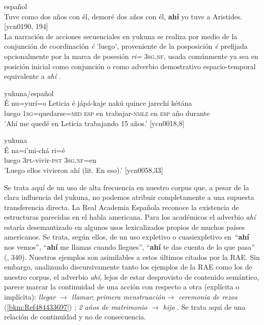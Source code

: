 \documentclass[output=paper]{langscibook}
\begin{document}
\ea\label{ex:lemus:13}
{español}\\
\label{bkm:Ref484433706}Tuve como dos años con él, demoré dos años con él, \textbf{ahí} yo tuve a Aristides. {[ycn0190, 194}]\\
\z
La narración de acciones secuenciales en yukuna se realiza por medio de la conjunción de coordinación \textit{é} 'luego', proveniente de la posposición \textit{é} prefijada opcionalmente por la marca de posesión \textit{ri=} 3\textsc{sg.nf}, usada comúnmente ya sea en posición inicial como conjunción  o como adverbio demostrativo espacio-temporal equivalente a \textit{ahí} .

\newpage
\ea\label{ex:lemus:14}
{yukuna/español}\\
\gll É  nu=yurí=o Leticia é   jápá-kaje   nakú   quince jarechí  kétána \\
luego 1\textsc{sg}=quedarse=\textsc{mid} \textsc{esp} en trabajar-\textsc{nmlz} {en} \textsc{esp} año    durante\\
\glt 'Ahí me quedé en Leticia trabajando 15 años.' [ycn0018,8]
\z

\ea\label{ex:lemus:15}
{yukuna}\\
\gll É na=i’mi-chá ri=é\\
     luego \textsc{3pl}-vivir-\textsc{pst}  \textsc{3sg.nf}=en\\
\glt 'Luego ellos vivieron ahí (lit. En eso).' [ycn0058,33]
\z

Se trata aquí de un uso de alta frecuencia en nuestro corpus que, a pesar de la clara influencia del yukuna, no podemos atribuir completamente a una supuesta transferencia directa. La Real Academia Española reconoce la existencia de estructuras parecidas en el habla americana.  Para los académicos el adverbio \textit{ahí} estaría desemantizado en algunos usos lexicalizados propios de muchos países americanos. Se trata, según ellos, de un uso expletivo o cuasiexpletivo en~“\textbf{ahí} nos vemos”, “\textbf{ahí} me llamas cuando llegues”, “\textbf{ahí} te das cuenta de lo que pasa” (\citealt{RAE2010}, 340).  Nuestros ejemplos son asimilables a estos últimos citados por la RAE.  Sin embargo, analizando discursivamente tanto los ejemplos de la RAE como los de nuestro corpus, el adverbio \textit{ahí,} lejos de estar desprovisto de contenido semántico, parece marcar la continuidad de una acción con respecto a otra (explícita o implícita): \textit{llegar $\to$ llamar}; \textit{primera menstruación}$\to$ \textit{ceremonia de rezos} (\ref{bkm:Ref484433697}) ; \textit{2 años de matrimonio} $\to$ \textit{hijo} .  Se trata aquí de una relación de continuidad y no de consecuencia.
\end{document}
